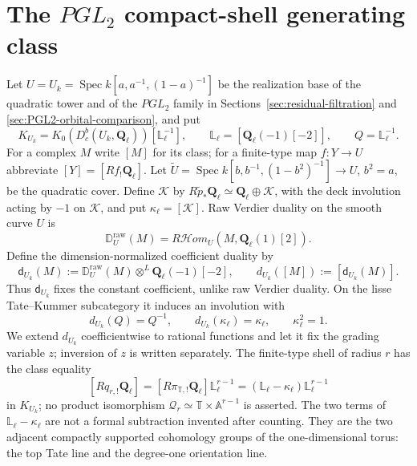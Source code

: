 \documentclass[11pt]{article}
\theoremstyle{definition}
\theoremstyle{remark}
\newcommand{\Qell}{\mathbf Q_\ell}
\newcommand{\Lell}{\mathbb L_{\ell}}
\newcommand{\Uk}{U_k}
\newcommand{\kappaell}{\kappa_{\ell}}
\newcommand{\cK}{\mathcal K}
\newcommand{\D}{\mathbb D}
\newcommand{\Spec}{\operatorname{Spec}}
\begin{document}
\section{The \texorpdfstring{$PGL_2$}{PGL2} compact-shell generating class}
\label{sec:quadratic-residual-series}

Let $U=\Uk=\Spec k[a,a^{-1},(1-a)^{-1}]$ be the realization base of the quadratic tower and
of the $PGL_2$ family in Sections~\ref{sec:residual-filtration} and
\ref{sec:PGL2-orbital-comparison}, and put
\[
 K_{\Uk}=K_0(D_c^b(\Uk,\Qell))[\Lell^{-1}],
 \qquad
 \Lell=[\Qell(-1)[-2]],\qquad Q=\Lell^{-1}.
\]
For a complex $M$ write $[M]$ for its class; for a finite-type map
$f:Y\to U$ abbreviate $[Y]=[Rf_!\Qell]$.  Let
$\widetilde U=\Spec k[b,b^{-1},(1-b^2)^{-1}]\to U$, $b^2=a$, be the
quadratic cover.
Define $\cK$ by
$R\widetilde p_*\Qell\simeq\Qell\oplus\cK$, with the deck involution acting
by $-1$ on $\cK$, and put $\kappaell=[\cK]$.  Raw Verdier duality on the smooth
curve $U$ is
\[
 \D_U^{\mathrm{raw}}(M)
 =R\mathcal Hom_U(M,\Qell(1)[2]).
\]
Define the dimension-normalized coefficient duality by
\begin{equation}
 \mathsf d_{\Uk}(M)
 :=\D_U^{\mathrm{raw}}(M)\otimes^L\Qell(-1)[-2],
 \qquad d_{\Uk}([M]):=[\mathsf d_{\Uk}(M)].
 \label{eq:normalized-U-duality}
\end{equation}
Thus $\mathsf d_{\Uk}$ fixes the constant coefficient, unlike raw Verdier
duality.  On the lisse Tate--Kummer subcategory it induces an involution with
\begin{equation}
 d_{\Uk}(Q)=Q^{-1},\qquad d_{\Uk}(\kappaell)=\kappaell,
 \qquad \kappaell^2=1.
 \label{eq:residual-coefficient-involution}
\end{equation}
We extend $d_{\Uk}$ coefficientwise to rational functions and let it fix the
grading variable $z$; inversion of $z$ is written separately.
The finite-type shell of radius $r$ has the class equality
\[
 [Rq_{r,!}\Qell]=[R\pi_{\mathbb T,!}\Qell]\Lell^{r-1}
 =(\Lell-\kappaell)\Lell^{r-1}
\]
in $K_{\Uk}$; no product isomorphism
$\mathscr Q_r\simeq\mathbb T\times\mathbb A^{r-1}$ is asserted.
The two terms of $\Lell-\kappaell$ are not a formal subtraction invented after
counting.  They are the two adjacent compactly supported cohomology groups of
the one-dimensional torus: the top Tate line and the degree-one orientation
line.
\end{document}
